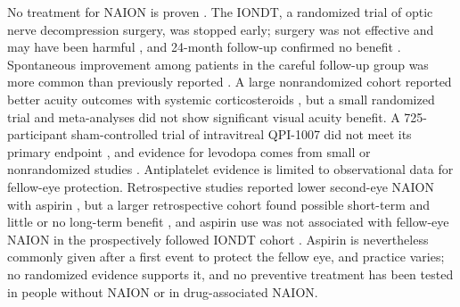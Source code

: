 \documentclass[journal]{IEEEtran}
\begin{document}
No treatment for NAION is proven \cite{p25763979, p35270411}. The
IONDT, a randomized trial of optic nerve decompression surgery, was
stopped early; surgery was not effective and may have been harmful
\cite{p7844872}, and 24-month follow-up confirmed no benefit
\cite{p10865316}. Spontaneous improvement among patients in the careful
follow-up group was more common than previously reported
\cite{p7844872}. A large nonrandomized cohort reported better acuity
outcomes with systemic corticosteroids \cite{p18404273}, but a small
randomized trial \cite{p29705054} and meta-analyses
\cite{p31725628, p35270411} did not show significant visual acuity
benefit. A 725-participant sham-controlled trial of intravitreal
QPI-1007 did not meet its primary endpoint \cite{p40816607}, and
evidence for levodopa comes from small or nonrandomized studies
\cite{p8554083, p10711891}. Antiplatelet evidence is limited to
observational data for fellow-eye protection. Retrospective studies
reported lower second-eye NAION with aspirin
\cite{p9427177, p10624433}, but a larger retrospective cohort found
possible short-term and little or no long-term benefit \cite{p9186127},
and aspirin use was not associated with fellow-eye NAION in the
prospectively followed IONDT cohort \cite{p12208242}. Aspirin is
nevertheless commonly given after a first event to protect the fellow
eye, and practice varies; no randomized evidence supports it, and no
preventive treatment has been tested in people without NAION or in
drug-associated NAION.
\end{document}
